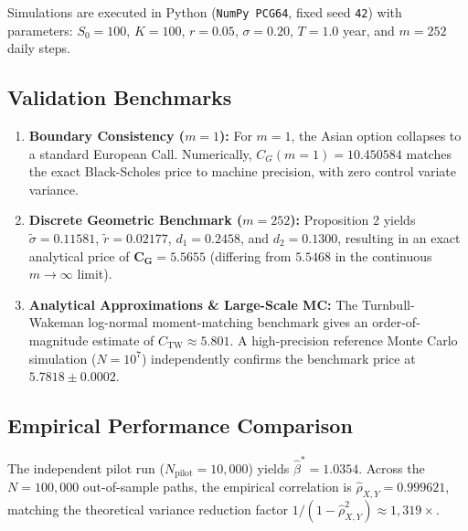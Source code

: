 \documentclass[11pt,a4paper]{article}
\begin{document}
Simulations are executed in Python (\texttt{NumPy PCG64}, fixed seed \texttt{42}) with parameters: $S_0 = 100$, $K = 100$, $r = 0.05$, $\sigma = 0.20$, $T = 1.0$ year, and $m = 252$ daily steps.

\subsection{Validation Benchmarks}
\begin{enumerate}
    \item \textbf{Boundary Consistency ($m=1$):} For $m=1$, the Asian option collapses to a standard European Call. Numerically, $C_G(m=1) = 10.450584$ matches the exact Black-Scholes price to machine precision, with zero control variate variance.
    \item \textbf{Discrete Geometric Benchmark ($m=252$):} Proposition 2 yields $\widetilde{\sigma} = 0.11581$, $\widetilde{r} = 0.02177$, $d_1 = 0.2458$, and $d_2 = 0.1300$, resulting in an exact analytical price of $\mathbf{C_G = 5.5655}$ (differing from $5.5468$ in the continuous $m \to \infty$ limit).
    \item \textbf{Analytical Approximations \& Large-Scale MC:} The Turnbull-Wakeman log-normal moment-matching benchmark gives an order-of-magnitude estimate of $C_{\text{TW}} \approx 5.801$. A high-precision reference Monte Carlo simulation ($N = 10^7$) independently confirms the benchmark price at $\mathbf{5.7818 \pm 0.0002}$.
\end{enumerate}

\subsection{Empirical Performance Comparison}
The independent pilot run ($N_{\text{pilot}} = 10,000$) yields $\hat{\beta}^* = 1.0354$. Across the $N = 100,000$ out-of-sample paths, the empirical correlation is $\hat{\rho}_{X,Y} = 0.999621$, matching the theoretical variance reduction factor $1 / (1 - \hat{\rho}_{X,Y}^2) \approx 1,319\times$.
\end{document}
